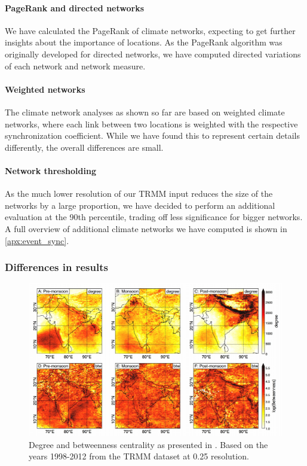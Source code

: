 \paragraph{PageRank and directed networks}
We have calculated the PageRank of climate networks, expecting to get further insights about the importance of locations. As the PageRank algorithm was originally developed for directed networks, we have computed directed variations of each network and network measure.

\paragraph{Weighted networks}
The climate network analyses as shown so far are based on weighted climate networks, where each link between two locations is weighted with the respective synchronization coefficient. While we have found this to represent certain details differently, the overall differences are small.

\paragraph{Network thresholding}
As the much lower resolution of our TRMM input reduces the size of the networks by a large proportion, we have decided to perform an additional evaluation at the 90th percentile, trading off less significance for bigger networks. A full overview of additional climate networks we have computed is shown in \cref{apx:event_sync}.

\subsubsection{Differences in results}

\begin{figure}[H]
  \centering
  \includegraphics[width=\textwidth]{./99_appendix/img/results_stolbova.png}
  \caption{Degree and betweenness centrality as presented in \citet{Stolbova.2015}. Based on the years 1998-2012 from the TRMM dataset at {0.25\degree} resolution.}
  \label{fig:results_stolbova}
\end{figure}

